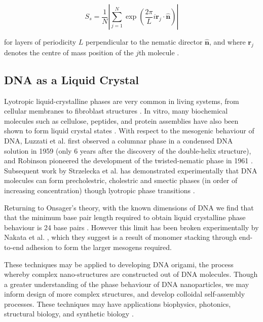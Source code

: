\documentclass[11pt, a4paper]{article} %
\providecommand{\DIFadd}[1]{{\protect\color{blue}\uwave{#1}}} %
\providecommand{\DIFaddbegin}{} %
\providecommand{\DIFaddend}{} %
\begin{document}
\begin{equation}
S_{s} = \frac{1}{N} \left\lvert \sum_{j=1}^{N} \exp \left( {\frac{2\pi}{L}i\textbf{r}_{j} \cdot \boldsymbol{\hat{n}}} \right) \right\rvert
\end{equation}

for layers of periodicity $L$ perpendicular to the nematic director $\boldsymbol{\hat{n}}$, and where $\textbf{r}_{j}$ denotes the centre of mass position of the $j$th molecule \cite{Dussi2018}.


\subsection{DNA as a Liquid Crystal} 
Lyotropic liquid-crystalline phases are very common in living systems, from cellular membranes to fibroblast structures \cite{Stewart1966, Rey2013}. In vitro, many biochemical molecules such as cellulose, peptides, and protein assemblies have also been shown to form liquid crystal states \cite{Zhao2019}. With respect to the mesogenic behaviour of DNA, Luzzati et al. first observed a columnar phase in a condensed DNA solution in 1959 (only 6 years after the discovery of the double-helix structure), and Robinson pioneered the development of the twisted-nematic phase in 1961 \cite{Luzzati1959, Robinson1961}. Subsequent work by Strzelecka et al. has demonstrated experimentally that DNA molecules can form precholestric, cholestric and smectic phases (in order of increasing concentration) though lyotropic phase transitions \cite{Strzelecka1988}. 

Returning to Onsager's theory, with the known dimensions of DNA we find that that the minimum base pair length required to obtain liquid crystalline phase behaviour is 24 base pairs \cite{Bolhuis1997}. However this limit has been broken experimentally by Nakata et al. \cite{Nakata2007, Zanchetta2008}, which they suggest is a result of monomer stacking through end-to-end adhesion to form the larger mesogens required.

These techniques may be applied to developing DNA origami, the process whereby complex nano-structures are constructed out of DNA molecules. Though a greater understanding of the phase behaviour of DNA nanoparticles, we may inform design of more complex structures, and develop colloidal self-assembly processes. These techniques may have applications \DIFaddbegin \DIFadd{in }\DIFaddend biophysics, photonics, structural biology, and synthetic biology \cite{Nummelin2018, Praetorius2017, Bathe2017}.
\end{document}
